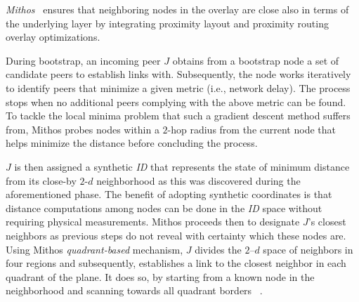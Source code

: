 




\emph{Mithos}~\cite{WR2003} ensures that neighboring nodes in the overlay are
close also in terms of the underlying layer by integrating proximity layout
and proximity routing overlay optimizations.

During bootstrap, an incoming peer $J$ obtains from a bootstrap node a set of
candidate peers to establish links with. 
Subsequently, the node works iteratively to identify peers that minimize
a given metric (i.e., network delay).
The process stops when no additional peers complying with the above metric 
can be found. 
% 
To tackle the local
minima problem that such a gradient descent method suffers from, Mithos probes
nodes within a $2$-hop radius from the current node that helps minimize
the distance before concluding the process.

$J$ is then assigned a synthetic \emph{ID} that
represents the state of minimum distance from its close-by $2$-$d$ neighborhood as
this was discovered during the aforementioned phase. %
The benefit of adopting synthetic coordinates is that distance computations
among nodes can be done in the \emph{ID} space without requiring physical
measurements. 
Mithos proceeds then to designate $J$'s closest neighbors as 
previous steps do not reveal with certainty which these nodes are.
Using Mithos \emph{quadrant-based} mechanism,
$J$  divides the $2$--$d$ space of neighbors in four regions and 
subsequently, establishes a link 
to the closest neighbor in each quadrant of the plane. 
It does so, by starting from a known node in the neighborhood
and scanning towards all quadrant borders ~\cite{KK2000,R2002}. 

